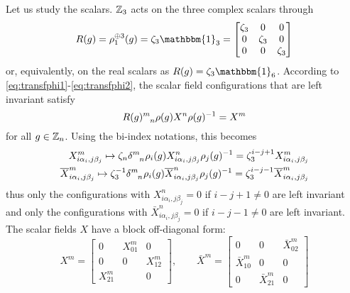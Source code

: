             Let us study the scalars. $\mathbb{Z}_3$ acts on the three complex scalars through
            \begin{equation}
                R(g)= \rho^{\oplus 3}_1(g) = \zeta_3\mathbbm{1}_3 =
                \begin{bmatrix}
                    \zeta_3 & 0 & 0 \\
                    0 & \zeta_3 & 0 \\
                    0 & 0 & \zeta_3
                \end{bmatrix}
            \end{equation}
            or, equivalently, on the real scalars as $R(g)=\zeta_3\mathbbm{1}_6$. According to \eqref{eq:transfphi1}-\eqref{eq:transfphi2}, the scalar field configurations that are left invariant satisfy
            \begin{equation}
                R(g)\indices{^m_n}\rho(g)X^n\rho(g)^{-1}=X^m
            \end{equation}
            for all $g\in\mathbb{Z}_n$. Using the bi-index notations, this becomes
            \begin{align}
                X^m_{i\alpha_i,j\beta_j}\mapsto  \zeta_n\delta\indices{^m_n}\rho_i(g) X^n_{i\alpha_i,j\beta_j}\rho_j(g)^{-1} = \zeta^{i-j+1}_3X^m_{i\alpha_i,j\beta_j}\\
                \bar{X}^m_{i\alpha_i,j\beta_j}\mapsto  \zeta^{-1}_3\delta\indices{^m_n}\rho_i(g) \bar{X}^n_{i\alpha_i,j\beta_j}\rho_j(g)^{-1} = \zeta^{i-j-1}_3\bar{X}^m_{i\alpha_i,j\beta_j}
            \end{align}
            thus only the configurations with $X^n_{i\alpha_i,j\beta_j}=0$ if $i-j+1\neq0$ are left invariant and only the configurations with $\bar{X}^n_{i\alpha_i,j\beta_j}=0$ if $i-j-1\neq0$ are left invariant. The scalar fields $X$ have a block off-diagonal form:
            \begin{equation}
                X^m=
                \begin{bmatrix}
                    0 & X^m_{01} & 0 \\
                    0 & 0 & X^m_{12} \\
                    X^m_{21} & & 0
                \end{bmatrix},\qquad
                \bar{X}^m=
                \begin{bmatrix}
                    0 & 0 & \bar{X}^m_{02} \\
                    \bar{X}^m_{10} & 0 & 0 \\
                    0 & \bar{X}^m_{21} & 0
                \end{bmatrix}
            \end{equation}
